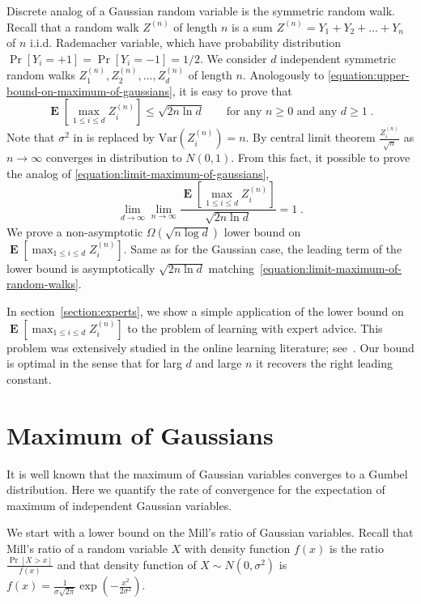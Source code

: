 \documentclass{article}
\DeclareMathOperator*{\Exp}{\mathbf{E}}
\newcommand{\Var}{\mathrm{Var}}
\begin{document}
Discrete analog of a Gaussian random variable is the symmetric random walk. Recall that a random walk $Z^{(n)}$
of length $n$ is a sum $Z^{(n)} = Y_1 + Y_2 + \dots + Y_n$ of $n$ i.i.d. Rademacher variable, which have probability distribution
$\Pr[Y_i = +1] = \Pr[Y_i = -1] = 1/2$. We consider $d$ independent symmetric random walks $Z^{(n)}_1, Z^{(n)}_2, \dots, Z^{(n)}_d$ of length $n$.
Anologously to \eqref{equation:upper-bound-on-maximum-of-gaussians}, it is easy to prove that
\begin{equation}
\label{equation:upper-bound-on-maximum-of-random-walks}
\Exp \left[ \max_{1 \le i \le d} Z^{(n)}_i \right] \le \sqrt{2 n \ln d} \qquad \text{for any $n \ge 0$ and any $d \ge 1$}\; .
\end{equation}
Note that $\sigma^2$ in is replaced by $\Var(Z^{(n)}_i) = n$. By central limit theorem $\frac{Z^{(n)}_i}{\sqrt{n}}$
as $n \to \infty$ converges in distribution to $N(0,1)$. From this fact, it possible to prove
the analog of \eqref{equation:limit-maximum-of-gaussians},
\begin{equation}
\label{equation:limit-maximum-of-random-walks}
\lim_{d \to \infty} \lim_{n \to \infty} \frac{\Exp\left[ \max_{1 \le i \le d} Z^{(n)}_i \right]}{\sqrt{2 n \ln d}} = 1 \; .
\end{equation}
We prove a non-asymptotic $\Omega(\sqrt{n \log d})$ lower bound on $\Exp\left[ \max_{1 \le i \le d} Z^{(n)}_i \right]$.
Same as for the Gaussian case, the leading term of the lower bound is asymptotically $\sqrt{2 n \ln d}$
matching~\eqref{equation:limit-maximum-of-random-walks}.

In section~\ref{section:experts}, we show a simple application of the lower
bound on $\Exp\left[\max_{1 \le i \le d} Z^{(n)}_i \right]$ to the problem of learning with
expert advice.  This problem was extensively studied in the online learning
literature; see~\citep{Cesa-BianchiL06}.  Our bound is optimal in the sense
that for larg $d$ and large $n$ it recovers the right leading constant.

\section{Maximum of Gaussians}
\label{section:maximum-of-gaussians}

It is well known that the maximum of Gaussian variables converges to a Gumbel
distribution. Here we quantify the rate of convergence for the expectation of
maximum of independent Gaussian variables.

We start with a lower bound on the Mill's ratio of Gaussian variables. Recall that Mill's ratio of a random variable $X$
with density function $f(x)$ is the ratio $\frac{\Pr[X > x]}{f(x)}$ and that density function of $X \sim N(0,\sigma^2)$
is $f(x) = \frac{1}{\sigma \sqrt{2 \pi}} \exp\left( - \frac{x^2}{2 \sigma^2} \right)$.
\end{document}
